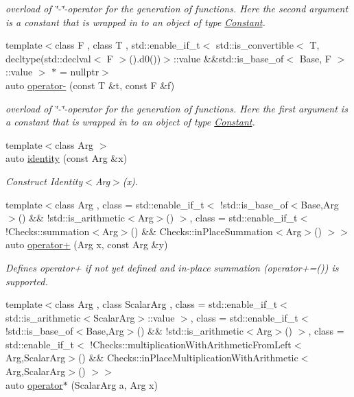 \begin{DoxyCompactItemize}
\begin{DoxyCompactList}\small\item\em overload of \char`\"{}-\/\char`\"{}-\/operator for the generation of functions. Here the second argument is a constant that is wrapped in to an object of type \hyperlink{structFunG_1_1Constant}{Constant}. \end{DoxyCompactList}\item 
{\footnotesize template$<$class F , class T , std\+::enable\+\_\+if\+\_\+t$<$ std\+::is\+\_\+convertible$<$ T, decltype(std\+::declval$<$ F $>$().\+d0())$>$\+::value \&\&std\+::is\+\_\+base\+\_\+of$<$ Base, F $>$\+::value $>$ $\ast$  = nullptr$>$ }\\auto \hyperlink{namespaceFunG_a7f522d98a8d5bc8c3b11599d3136ded4}{operator-\/} (const T \&t, const F \&f)
\begin{DoxyCompactList}\small\item\em overload of \char`\"{}-\/\char`\"{}-\/operator for the generation of functions. Here the first argument is a constant that is wrapped in to an object of type \hyperlink{structFunG_1_1Constant}{Constant}. \end{DoxyCompactList}\item 
{\footnotesize template$<$class Arg $>$ }\\auto \hyperlink{namespaceFunG_a165e879e76d3a2a8906938f3658445ce}{identity} (const Arg \&x)
\begin{DoxyCompactList}\small\item\em Construct Identity$<$\+Arg$>$(x). \end{DoxyCompactList}\item 
{\footnotesize template$<$class Arg , class  = std\+::enable\+\_\+if\+\_\+t$<$ !std\+::is\+\_\+base\+\_\+of$<$\+Base,\+Arg$>$() \&\& !std\+::is\+\_\+arithmetic$<$\+Arg$>$() $>$, class  = std\+::enable\+\_\+if\+\_\+t$<$ !\+Checks\+::summation$<$\+Arg$>$() \&\&                                       Checks\+::in\+Place\+Summation$<$\+Arg$>$() $>$$>$ }\\auto \hyperlink{namespaceFunG_a063d3e8c19dbea3ee1396736fecb64e1}{operator+} (Arg x, const Arg \&y)
\begin{DoxyCompactList}\small\item\em Defines operator+ if not yet defined and in-\/place summation (operator+=()) is supported. \end{DoxyCompactList}\item 
{\footnotesize template$<$class Arg , class Scalar\+Arg , class  = std\+::enable\+\_\+if\+\_\+t$<$ std\+::is\+\_\+arithmetic$<$\+Scalar\+Arg$>$\+::value $>$, class  = std\+::enable\+\_\+if\+\_\+t$<$ !std\+::is\+\_\+base\+\_\+of$<$\+Base,\+Arg$>$() \&\& !std\+::is\+\_\+arithmetic$<$\+Arg$>$() $>$, class  = std\+::enable\+\_\+if\+\_\+t$<$ !\+Checks\+::multiplication\+With\+Arithmetic\+From\+Left$<$\+Arg,\+Scalar\+Arg$>$() \&\&                                       Checks\+::in\+Place\+Multiplication\+With\+Arithmetic$<$\+Arg,\+Scalar\+Arg$>$() $>$$>$ }\\auto \hyperlink{namespaceFunG_a9b303ce8718a6f64b035e7e782370734}{operator$\ast$} (Scalar\+Arg a, Arg x)

\end{DoxyCompactItemize}
